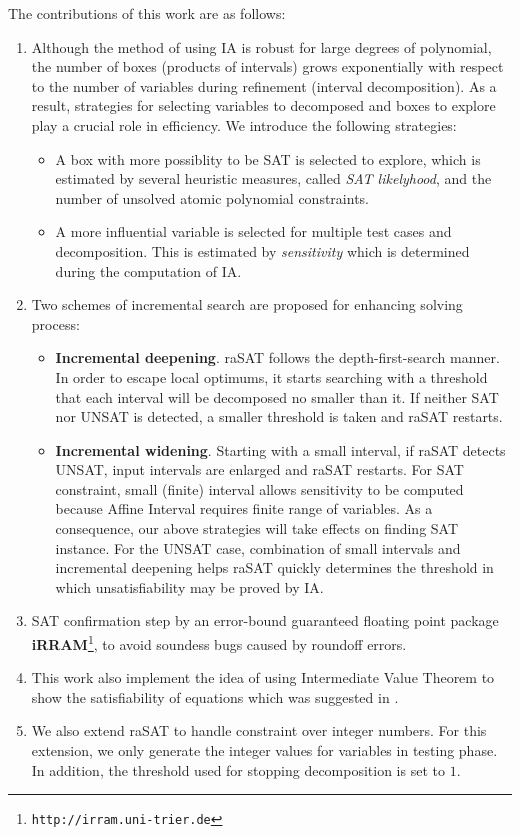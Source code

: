 The contributions of this work are as follows:
\begin{enumerate}
\item Although the method of using IA is robust for large degrees of polynomial, the number of boxes (products of intervals) grows exponentially with respect to the number of variables during refinement (interval decomposition). As a result, strategies for selecting variables to decomposed and boxes to explore play a crucial role in efficiency. We introduce the following strategies:
\begin{itemize}
\item A box with more possiblity to be SAT is selected to explore, which is estimated by 
several heuristic measures, called {\em SAT likelyhood}, 
and the number of unsolved atomic polynomial constraints.
\item A more influential variable is selected for multiple test cases and decomposition. 
This is estimated by {\em sensitivity} which is determined during the computation of IA.
\end{itemize}
\item Two schemes of incremental search are proposed for enhancing solving process: 
\begin{itemize} 
\item {\bf Incremental deepening}. 
raSAT follows the depth-first-search manner. In order to escape local optimums, it starts searching with a threshold that each interval will be decomposed no smaller than it. 
If neither SAT nor UNSAT is detected, a smaller threshold is taken and raSAT restarts. 
\item {\bf Incremental widening}. 
Starting with a small interval, if raSAT detects UNSAT, input intervals are enlarged
and raSAT restarts. For SAT constraint, small (finite) interval allows sensitivity to be computed because Affine Interval \cite{VanKhanh201227} requires finite range of variables. As a consequence, our above strategies will take effects on finding SAT instance. For the UNSAT case, combination of small intervals and incremental deepening helps raSAT quickly determines the threshold in which unsatisfiability may be proved by IA. 
\end{itemize} 
\begin{comment}
SAT-likelihood is introduced to measure the possibility of an inequality to be satisfiable. Sensitivity is proposed to estimate the influence of a variable to the value of a polynomial.
\end{comment}
\item SAT confirmation step by an error-bound guaranteed floating point package {\bf iRRAM}\footnote{%
\tt http://irram.uni-trier.de}, to avoid soundess bugs caused by roundoff errors.
\item This work also implement the idea of using Intermediate Value Theorem to show the satisfiability of equations which was suggested in \cite{VanKhanh201227}.
\item We also extend raSAT to handle constraint over integer numbers. For this extension, we only generate the integer values for variables in testing phase. In addition, the threshold used for stopping decomposition is set to $1$.
\end{enumerate}
